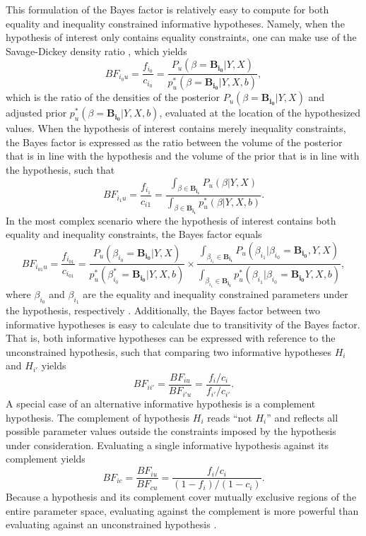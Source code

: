 \documentclass[
  authoryear,
  preprint,
  5p,
  twocolumn]{elsarticle}
\begin{document}
This formulation of the Bayes factor is relatively easy to compute for
both equality and inequality constrained informative hypotheses. Namely,
when the hypothesis of interest only contains equality constraints, one
can make use of the Savage-Dickey density ratio
\citep{savage_dickey_1971}, which yields \[
BF_{i_0u} = \frac{f_{i_0}}{c_{i_0}} = \frac{
  P_u(\beta = \boldsymbol{B_{i_0}} | Y, X)
}{
  p_u^*(\beta = \boldsymbol{B_{i_0}} | Y, X, b)
},
\] which is the ratio of the densities of the posterior
\(P_u(\beta = \boldsymbol{B_{i_0}} | Y, X)\) and adjusted prior
\(p^*_u(\beta = \boldsymbol{B_{i_0}} | Y, X, b)\), evaluated at the
location of the hypothesized values. When the hypothesis of interest
contains merely inequality constraints, the Bayes factor is expressed as
the ratio between the volume of the posterior that is in line with the
hypothesis and the volume of the prior that is in line with the
hypothesis, such that \[
BF_{i_1u} = \frac{f_{i_1}}{c_{i1}} = 
\frac{
  \int_{\beta \in \boldsymbol{B_{i_1}}} P_u(\beta | Y, X)
}{
  \int_{\beta \in \boldsymbol{B_{i_1}}} p_u^*(\beta | Y, X, b)
}.
\] In the most complex scenario where the hypothesis of interest
contains both equality and inequality constraints, the Bayes factor
equals \[
BF_{i_{01}u} = \frac{f_{i_{01}}}{c_{i_{01}}} = \frac{
  P_u(\beta_{i_0} = \boldsymbol{B_{i_0}} | Y, X)
}{
  p^*_u(\beta^*_{i_0} = \boldsymbol{B_{i_0}} | Y, X, b)
} \times
\frac{
  \int_{\beta_{i_1} \in \boldsymbol{B_{i_1}}} P_u(\beta_{i_1} | \beta_{i_0} = \boldsymbol{B_{i_0}}, Y, X)
}{
  \int_{\beta_{i_1} \in \boldsymbol{B_{i_1}}} p^*_u(\beta_{i_1} | \beta_{i_0} = \boldsymbol{B_{i_0}}Y, X, b)
},
\] where \(\beta_{i_0}\) and \(\beta_{i_1}\) are the equality and
inequality constrained parameters under the hypothesis, respectively
\citep{gu_approximated_2018}. Additionally, the Bayes factor between two
informative hypotheses is easy to calculate due to transitivity of the
Bayes factor. That is, both informative hypotheses can be expressed with
reference to the unconstrained hypothesis, such that comparing two
informative hypotheses \(H_i\) and \(H_{i'}\) yields \[
BF_{ii'} = \frac{BF_{iu}}{BF_{i'u}} = \frac{f_i / c_i}{f_{i'}/c_{i'}}.
\] A special case of an alternative informative hypothesis is a
complement hypothesis. The complement of hypothesis \(H_i\) reads ``not
\(H_i\)'' and reflects all possible parameter values outside the
constraints imposed by the hypothesis under consideration. Evaluating a
single informative hypothesis against its complement yields \[
BF_{i c} = \frac{BF_{iu}}{BF_{cu}} = \frac{f_i/c_i}{(1 - f_i) / (1 - c_i)}.
\] Because a hypothesis and its complement cover mutually exclusive
regions of the entire parameter space, evaluating against the complement
is more powerful than evaluating against an unconstrained hypothesis
\citep{klugkist_volker}.
\end{document}
